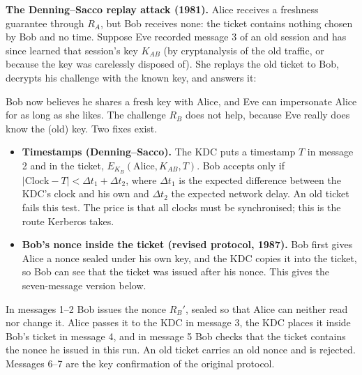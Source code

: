 \textbf{The Denning--Sacco replay attack (1981).} Alice receives a freshness guarantee through $R_A$, but Bob receives none: the ticket contains nothing chosen by Bob and no time. Suppose Eve recorded message 3 of an old session and has since learned that session's key $K_{AB}$ (by cryptanalysis of the old traffic, or because the key was carelessly disposed of). She replays the old ticket to Bob, decrypts his challenge with the known key, and answers it:
\begin{center}
\end{center}
Bob now believes he shares a fresh key with Alice, and Eve can impersonate Alice for as long as she likes. The challenge $R_B$ does not help, because Eve really does know the (old) key. Two fixes exist.
\begin{itemize}
  \item \textbf{Timestamps (Denning--Sacco).} The KDC puts a timestamp $T$ in message 2 and in the ticket, $E_{K_B}(\text{Alice}, K_{AB}, T)$. Bob accepts only if $|\text{Clock} - T| < \Delta t_1 + \Delta t_2$, where $\Delta t_1$ is the expected difference between the KDC's clock and his own and $\Delta t_2$ the expected network delay. An old ticket fails this test. The price is that all clocks must be synchronised; this is the route Kerberos takes.
  \item \textbf{Bob's nonce inside the ticket (revised protocol, 1987).} Bob first gives Alice a nonce sealed under his own key, and the KDC copies it into the ticket, so Bob can see that the ticket was issued after his nonce. This gives the seven-message version below.
\end{itemize}
\begin{center}
\end{center}
In messages 1--2 Bob issues the nonce $R_B'$, sealed so that Alice can neither read nor change it. Alice passes it to the KDC in message 3, the KDC places it inside Bob's ticket in message 4, and in message 5 Bob checks that the ticket contains the nonce he issued in this run. An old ticket carries an old nonce and is rejected. Messages 6--7 are the key confirmation of the original protocol.

